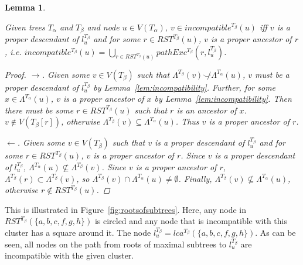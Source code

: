 \documentclass{article}
\newcommand{\compatible}{\smile}
\newcommand{\leafset}{\Lambda}
\newcommand{\TA}{T_\alpha}
\newcommand{\TB}{T_\beta}
\newtheorem{incompatibilityrootsofsubtrees}[incompatibility]{Lemma}
\begin{document}
    \begin{incompatibilityrootsofsubtrees}
        \label{lem:incompatibilityrootsofsubtrees}

        Given trees $\TA$ and $\TB$ and node $u \in V(\TA)$, $v \in incompatible^{\TB}(u)$ iff $v$ is a proper descendant of $l_u^{\TB}$ and for some $r \in RST^{\TB}(u)$, $v$ is a proper ancestor of $r$, i.e. $incompatible^{\TB}(u) = \bigcup_{r \in RST^{\TB}(u)} pathExc^{\TB}(r, l_u^{\TB})$.

        \begin{proof}
            $\longrightarrow$. Given some $v \in V(\TB)$ such that $\leafset^{\TB}(v) \not\compatible \leafset^{\TA}(u)$, $v$ must be a proper descendant of $l_u^{\TB}$ by Lemma~\ref{lem:incompatibility}. Further, for some $x \in \leafset^{\TA}(u)$, $v$ is a proper ancestor of $x$ by Lemma~\ref{lem:incompatibility}. Then there must be some $r \in RST^{\TB}(u)$ such that $r$ is an ancestor of $x$. $v \not\in V(\TB[r])$, otherwise $\leafset^{\TB}(v) \subseteq \leafset^{\TA}(u)$. Thus $v$ is a proper ancestor of $r$.

            $\longleftarrow$. Given some $v \in V(\TB)$ such that $v$ is a proper descendant of $l_u^{\TB}$ and for some $r \in RST^{\TB}(u)$, $v$ is a proper ancestor of $r$. Since $v$ is a proper descendant of $l_u^{\TB}$, $\leafset^{\TA}(u) \not\subseteq \leafset^{\TB}(v)$. Since $v$ is a proper ancestor of $r$, $\leafset^{\TB}(r) \subset \leafset^{\TB}(v)$, so $\leafset^{\TB}(v) \cap \leafset^{\TA}(u) \neq \emptyset$. Finally, $\leafset^{\TB}(v) \not\subseteq \leafset^{\TA}(u)$, otherwise $r \not\in RST^{\TB}(u)$.
        \end{proof}
    \end{incompatibilityrootsofsubtrees}

    This is illustrated in Figure~\ref{fig:rootsofsubtrees}. Here, any node in $RST^{\TB}(\{a, b, c, f, g, h\})$ is circled and any node that is incompatible with this cluster has a square around it. The node $l_u^{\TB} = lca^{\TB}(\{a, b, c, f, g, h\})$. As can be seen, all nodes on the path from roots of maximal subtrees to $l_u^{\TB}$ are incompatible with the given cluster.
\end{document}
